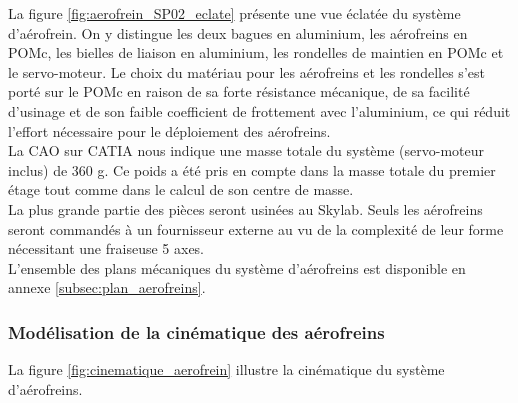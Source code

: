 \begin{minipage}{0.35\textwidth}
    La figure \ref{fig:aerofrein_SP02_eclate} présente une vue éclatée du système d'aérofrein. On y distingue les deux bagues
    en aluminium, les aérofreins en \gls{POMc}, les bielles de liaison en aluminium, les rondelles de maintien en \gls{POMc} et
    le servo-moteur. Le choix du matériau pour les aérofreins et les rondelles s'est porté sur le \gls{POMc} en raison de sa
    forte résistance mécanique, de sa facilité d'usinage et de son faible coefficient de frottement avec l'aluminium, ce qui
    réduit l'effort nécessaire pour le déploiement des aérofreins.\\

    La \acrshort{CAO} sur \acrshort{CATIA} nous indique une masse totale du système (servo-moteur inclus) de 360 g. Ce poids
    a été pris en compte dans la masse totale du premier étage tout comme dans le calcul de son centre de masse.\\
    
    La plus grande partie des pièces seront usinées au \gls{Skylab}. Seuls les aérofreins seront commandés à un fournisseur
    externe au vu de la complexité de leur forme nécessitant une fraiseuse 5 axes.\\

    L'ensemble des plans mécaniques du système d'aérofreins est disponible en annexe \ref{subsec:plan_aerofreins}.
\end{minipage}

\subsubsection{Modélisation de la cinématique des aérofreins}

La figure \ref{fig:cinematique_aerofrein} illustre la cinématique du système d'aérofreins.

\vfill

